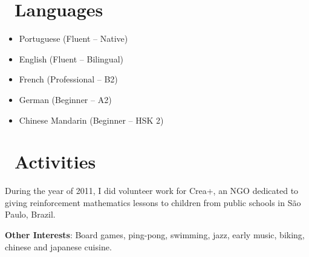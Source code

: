\documentclass[12pt]{article}
\begin{document}
\section*{\textcolor{Fuchsia}\faLanguage\ Languages}

\begin{minipage}[t]{0.45\textwidth}
\begin{itemize}
\setlength{\itemsep}{0pt}
\item Portuguese (Fluent – Native)
\item English (Fluent – Bilingual)
\item French (Professional – B2)
\end{itemize}
\end{minipage}
\begin{minipage}[t]{0.55\textwidth}
\begin{itemize}
\setlength{\itemsep}{0pt}
\item German (Beginner – A2)
\item Chinese Mandarin (Beginner – HSK 2)
\end{itemize}
\hfill
\end{minipage}


\section*{\textcolor{Fuchsia}\faRunning\ Activities}

During the year of 2011, I did volunteer work for Crea+, an NGO dedicated to giving reinforcement mathematics lessons to children from public schools in São Paulo, Brazil.

\smallskip
\textbf{Other Interests}: Board games, ping-pong, swimming, jazz, early music, biking, chinese and japanese cuisine.
\end{document}
